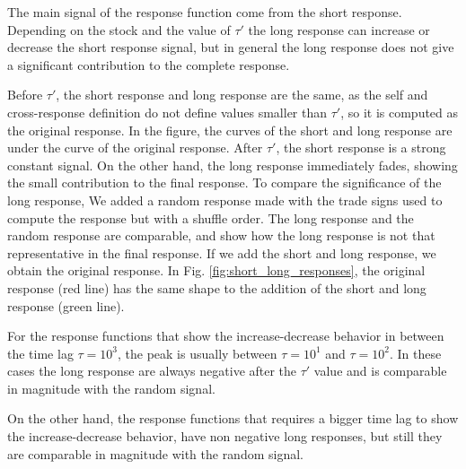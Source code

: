 The main signal of the response function come from the short response.
Depending on the stock and the value of $\tau'$ the long response can increase
or decrease the short response signal, but in general the long response does
not give a significant contribution to the complete response.

Before $\tau'$, the short response and long response are the same, as the self
and cross-response definition do not define values smaller than $\tau '$, so it
is computed as the original response. In the figure, the curves of the short
and long response are under the curve of the original response. After $\tau'$,
the short response is a strong constant signal. On the other hand, the long
response immediately fades, showing the small contribution to the final
response. To compare the significance of the long response, We added a random
response made with the trade signs used to compute the response but with a
shuffle order. The long response and the random response are comparable, and
show how the long response is not that representative in the final response.
If we add the short and long response, we obtain the original response. In Fig.
\ref{fig:short_long_responses}, the original response (red line) has the same
shape to the addition of the short and long response (green line).

For the response functions that show the increase-decrease behavior in between
the time lag $\tau = 10^{3}$, the peak is usually between $\tau = 10^{1}$ and
$\tau = 10^{2}$. In these cases the long response are always negative after the
$\tau'$ value and is comparable in magnitude with the random signal.

On the other hand, the response functions that requires a bigger time lag to
show the increase-decrease behavior, have non negative long responses, but
still they are comparable in magnitude with the random signal.